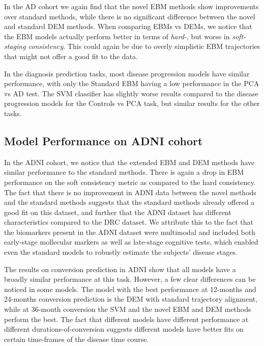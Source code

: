 In the AD cohort we again find that the novel EBM methods show improvements over standard methods, while there is no significant difference between the novel and standard DEM methods. When comparing EBMs vs DEMs, we notice that the EBM models actually perform better in terms of \emph{hard-}, but worse in \emph{soft-staging consistency}. This could again be due to overly simplistic EBM trajectories that might not offer a good fit to the data.

In the diagnosis prediction tasks, most disease progression models have similar performance, with only the Standard EBM having a low performance in the PCA vs AD test. The SVM classifier has slightly worse results compared to the disease progression models for the Controls vs PCA task, but similar results for the other tasks.  

\subsection{Model Performance on ADNI cohort}
\label{sec:perfDisAdni}

In the ADNI cohort, we notice that the extended EBM and DEM methods have similar performance to the standard methods. There is again a drop in EBM performance on the soft consistency metric as compared to the hard consistency. The fact that there is no improvement in ADNI data between the novel methods and the standard methods suggests that the standard methods already offered a good fit on this dataset, and further that the ADNI dataset has different characteristics compared to the DRC dataset. We attribute this to the fact that the biomarkers present in the ADNI dataset were multimodal and included both early-stage mollecular markers as well as late-stage cognitive tests, which enabled even the standard models to robustly estimate the subjects' disease stages. 


The results on conversion prediction in ADNI show that all models have a broadly similar performance at this task. However, a few clear differences can be noticed in some models. The model with the best performance at 12-months and 24-months conversion prediction is the DEM with standard trajectory alignment, while at 36-month conversion the SVM and the novel EBM and DEM methods perform the best. The fact that different models have different performance at different durations-of-conversion suggests different models have better fits on certain time-frames of the disease time course.



